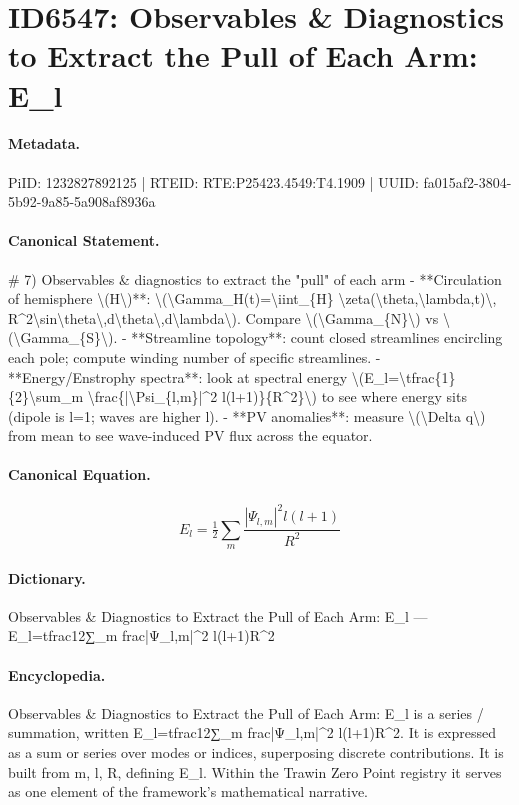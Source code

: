 \section*{ID6547: Observables \& Diagnostics to Extract the Pull of Each Arm: E\_l}
\paragraph{Metadata.}
PiID: 1232827892125 | RTEID: RTE:P25423.4549:T4.1909 | UUID: fa015af2-3804-5b92-9a85-5a908af8936a

\paragraph{Canonical Statement.}
\# 7) Observables \& diagnostics to extract the "pull" of each arm - **Circulation of hemisphere \textbackslash{}(H\textbackslash{})**: \textbackslash{}(\textbackslash{}Gamma\_H(t)=\textbackslash{}iint\_\{H\} \textbackslash{}zeta(\textbackslash{}theta,\textbackslash{}lambda,t)\textbackslash{}, R\textasciicircum{}2\textbackslash{}sin\textbackslash{}theta\textbackslash{},d\textbackslash{}theta\textbackslash{},d\textbackslash{}lambda\textbackslash{}). Compare \textbackslash{}(\textbackslash{}Gamma\_\{N\}\textbackslash{}) vs \textbackslash{}(\textbackslash{}Gamma\_\{S\}\textbackslash{}). - **Streamline topology**: count closed streamlines encircling each pole; compute winding number of specific streamlines. - **Energy/Enstrophy spectra**: look at spectral energy \textbackslash{}(E\_l=\textbackslash{}tfrac\{1\}\{2\}\textbackslash{}sum\_m \textbackslash{}frac\{|\textbackslash{}Psi\_\{l,m\}|\textasciicircum{}2 l(l+1)\}\{R\textasciicircum{}2\}\textbackslash{}) to see where energy sits (dipole is l=1; waves are higher l). - **PV anomalies**: measure \textbackslash{}(\textbackslash{}Delta q\textbackslash{}) from mean to see wave-induced PV flux across the equator.

\paragraph{Canonical Equation.}
\[
E_l=\tfrac{1}{2}\sum_m \frac{|\Psi_{l,m}|^2 l(l+1)}{R^2}
\]

\paragraph{Dictionary.}
Observables \& Diagnostics to Extract the Pull of Each Arm: E\_l — E\_l=tfrac12∑\_m frac|Ψ\_l,m|\textasciicircum{}2 l(l+1)R\textasciicircum{}2

\paragraph{Encyclopedia.}
Observables \& Diagnostics to Extract the Pull of Each Arm: E\_l is a series / summation, written E\_l=tfrac12∑\_m frac|Ψ\_l,m|\textasciicircum{}2 l(l+1)R\textasciicircum{}2. It is expressed as a sum or series over modes or indices, superposing discrete contributions. It is built from m, l, R, defining E\_l. Within the Trawin Zero Point registry it serves as one element of the framework's mathematical narrative.

